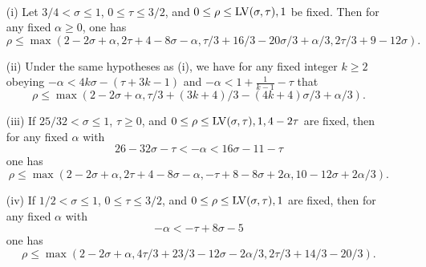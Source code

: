     \begin{lemma}\label{kerr-thm}\
        \begin{itemize}
        \item[(i)]\cite[Theorem 2]{kerr} Let $3/4 < \sigma \leq 1$, $0 \leq \tau \leq 3/2$, and $0 \leq \rho \leq \mathrm{LV}(\sigma,\tau), 1$ be fixed.  Then for any fixed $\alpha \geq 0$, one has
        $$ \rho \leq \max( 2-2\sigma+\alpha, 2\tau+4-8\sigma-\alpha, \tau/3+16/3 -20\sigma/3 + \alpha/3, 2\tau/3+9-12\sigma).$$
        \item[(ii)] \cite[Theorem 3]{kerr} Under the same hypotheses as (i), we have for any fixed integer $k \geq 2$ obeying
        $-\alpha < 4k\sigma -(\tau+3k-1)$ and $-\alpha < 1 + \frac{1}{k-1} - \tau$ that
        $$ \rho \leq \max(2-2\sigma+\alpha, \tau/3+(3k+4)/3-(4k+4)\sigma/3 + \alpha/3).$$
        \item[(iii)] \cite[Theorem 4]{kerr} If $25/32 < \sigma \leq 1$, $\tau \geq 0$, and $0 \leq \rho \leq \mathrm{LV}(\sigma,\tau), 1, 4-2\tau$ are fixed, then for any fixed $\alpha$ with
        $$ 26 - 32 \sigma - \tau < - \alpha < 16\sigma -11-\tau$$
        one has
        $$ \rho \leq \max( 2-2\sigma+\alpha, 2\tau+4-8\sigma-\alpha, -\tau+8-8\sigma+2\alpha, 10-12\sigma+2\alpha/3).$$
        \item[(iv)] \cite[Theorem 5]{kerr} If $1/2 < \sigma \leq 1$, $0 \leq \tau \leq 3/2$, and $0 \leq \rho \leq \mathrm{LV}(\sigma,\tau), 1$ are fixed, then for any fixed $\alpha$ with
        $$ - \alpha < -\tau + 8\sigma - 5$$
        one has
        $$ \rho \leq \max(2-2\sigma+\alpha, 4\tau/3 +23/3 - 12\sigma - 2\alpha/3, 2\tau/3 + 14/3 - 20/3 ).$$
    \end{itemize}
    \end{lemma}
